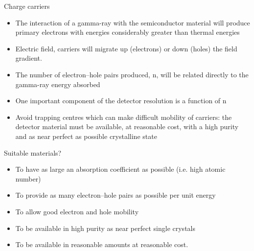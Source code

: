 \begin{frame}{Charge carriers}

\begin{exampleblock}{}
{\small
\begin{itemize}
\item The interaction of a gamma-ray with the semiconductor material will produce primary electrons with energies considerably greater than thermal energies 
\item Electric field, carriers will migrate up (electrons) or down (holes) the field gradient. 
\item The number of electron–hole pairs produced, n, will be related directly to the gamma-ray energy absorbed 
\item One important component of the detector resolution is a function of n 
\item Avoid trapping centres which can make difficult mobility of carriers: the detector material must be available, at reasonable cost, with a high purity and as near perfect as possible crystalline state
\end{itemize}
}
\end{exampleblock}

\end{frame}

\begin{frame}{Suitable materials?}

\begin{exampleblock}{}
{\small
\begin{itemize}
\item To have as large an absorption coefficient as possible (i.e. high atomic number)
\item To provide as many electron–hole pairs as possible per unit energy
\item To allow good electron and hole mobility
\item To be available in high purity as near perfect single crystals
\item To be available in reasonable amounts at reasonable cost.
\end{itemize}
}
\end{exampleblock}

\end{frame}

